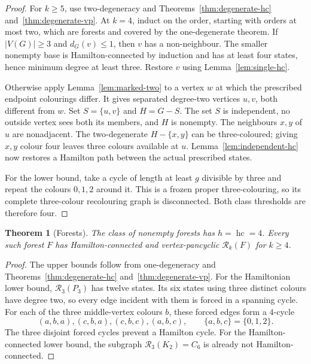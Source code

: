 \documentclass[11pt]{article}
\newtheorem{theorem}{Theorem}[section]
\theoremstyle{remark}
\newcommand{\R}{\mathcal R}
\newcommand{\Rk}{\mathcal R_k}
\newcommand{\hc}{\operatorname{hc}}
\numberwithin{equation}{section}
\begin{document}
\begin{proof}
For $k\ge5$, use two-degeneracy and
Theorems~\ref{thm:degenerate-hc} and~\ref{thm:degenerate-vp}.
At $k=4$, induct on the order, starting with orders at most two,
which are forests and covered by the one-degenerate theorem.
If $|V(G)|\ge3$ and $d_G(v)\le1$, then $v$ has a non-neighbour.
The smaller nonempty base is Hamilton-connected by induction and has
at least four states, hence minimum degree at least three.  Restore
$v$ using Lemma~\ref{lem:single-hc}.

Otherwise apply Lemma~\ref{lem:marked-two} to a vertex $w$ at which
the prescribed endpoint colourings differ.  It gives separated
degree-two vertices $u,v$, both different from $w$.  Set
$S=\{u,v\}$ and $H=G-S$.  The set $S$ is independent, no outside
vertex sees both its members, and $H$ is nonempty.  The neighbours
$x,y$ of $u$ are nonadjacent.  The two-degenerate $H-\{x,y\}$
can be three-coloured; giving $x,y$ colour four leaves three colours
available at $u$.  Lemma~\ref{lem:independent-hc} now restores a
Hamilton path between the actual prescribed states.

For the lower bound, take a cycle of length at least $g$ divisible by
three and repeat the colours $0,1,2$ around it.  This is a frozen
proper three-colouring, so its complete three-colour recolouring graph
is disconnected.  Both class thresholds are therefore four.
\end{proof}

\begin{theorem}[Forests]
\label{thm:forest-hc}
The class of nonempty forests has $h=\hc=4$.  Every such forest
$F$ has Hamilton-connected and vertex-pancyclic $\Rk(F)$ for
$k\ge4$.
\end{theorem}

\begin{proof}
The upper bounds follow from one-degeneracy and
Theorems~\ref{thm:degenerate-hc} and~\ref{thm:degenerate-vp}.
For the Hamiltonian lower bound, $\R_3(P_3)$ has twelve
states.  Its six states using three distinct colours have degree two,
so every edge incident with them is forced in a spanning cycle.
For each of the three middle-vertex colours $b$, these forced edges
form a $4$-cycle
\[
 (a,b,a),(c,b,a),(c,b,c),(a,b,c),
 \qquad \{a,b,c\}=\{0,1,2\}.
\]
The three disjoint forced cycles prevent a Hamilton cycle.  For the
Hamilton-connected lower bound, the subgraph $\R_3(K_2)=C_6$
is already not Hamilton-connected.
\end{proof}
\end{document}
